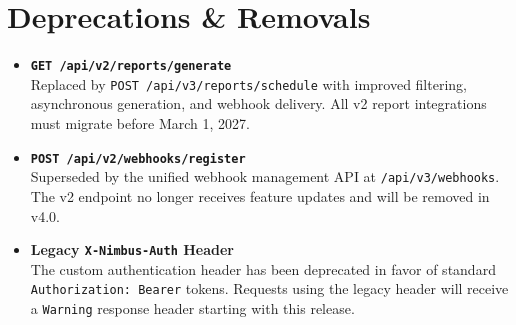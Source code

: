 \section{\faExclamationTriangle\hspace{6pt}Deprecations \& Removals}

\begin{depbox}
  \small
  \begin{itemize}[leftmargin=*,nosep,itemsep=6pt,topsep=2pt]
    \item \textbf{\texttt{GET /api/v2/reports/generate}}
      \hfill\mbox{}\\[2pt]
      Replaced by \texttt{POST /api/v3/reports/schedule} with improved
      filtering, asynchronous generation, and webhook delivery. All v2 report
      integrations must migrate before March 1, 2027.

    \item \textbf{\texttt{POST /api/v2/webhooks/register}}
      \hfill\mbox{}\\[2pt]
      Superseded by the unified webhook management API at
      \texttt{/api/v3/webhooks}. The v2 endpoint no longer receives feature
      updates and will be removed in v4.0.

    \item \textbf{Legacy \texttt{X-Nimbus-Auth} Header}\\[2pt]
      The custom authentication header has been deprecated in favor of
      standard \texttt{Authorization: Bearer} tokens. Requests using the
      legacy header will receive a \texttt{Warning} response header starting
      with this release.
  \end{itemize}
\end{depbox}

